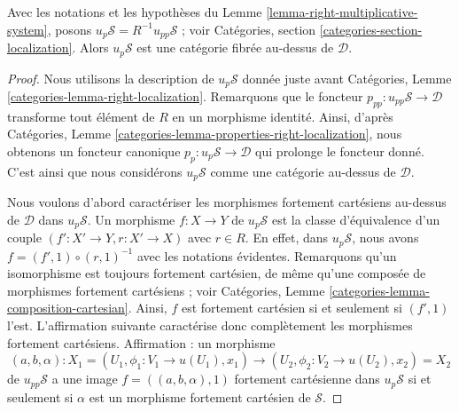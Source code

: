 \begin{lemma}
\label{lemma-fibred-category-pullback}
Avec les notations et les hypothèses du
Lemme \ref{lemma-right-multiplicative-system},
posons $u_p\mathcal{S} = R^{-1}u_{pp}\mathcal{S}$ ; voir
Catégories, section \ref{categories-section-localization}.
Alors $u_p\mathcal{S}$ est une catégorie fibrée au-dessus de $\mathcal{D}$.
\end{lemma}

\begin{proof}
Nous utilisons la description de $u_p\mathcal{S}$ donnée juste avant
Catégories, Lemme \ref{categories-lemma-right-localization}.
Remarquons que le foncteur $p_{pp} : u_{pp}\mathcal{S} \to \mathcal{D}$
transforme tout élément de $R$ en un morphisme identité.
Ainsi, d'après
Catégories, Lemme \ref{categories-lemma-properties-right-localization},
nous obtenons un foncteur canonique $p_p : u_p\mathcal{S} \to \mathcal{D}$
qui prolonge le foncteur donné. C'est ainsi que nous considérons
$u_p\mathcal{S}$ comme une catégorie au-dessus de $\mathcal{D}$.

\medskip\noindent
Nous voulons d'abord caractériser les morphismes fortement cartésiens au-dessus de $\mathcal{D}$
dans $u_p\mathcal{S}$.
Un morphisme $f : X \to Y$ de $u_p\mathcal{S}$ est la classe d'équivalence
d'un couple $(f' : X' \to Y, r : X' \to X)$ avec $r \in R$.
En effet, dans $u_p\mathcal{S}$, nous avons $f = (f', 1) \circ (r, 1)^{-1}$
avec les notations évidentes.
Remarquons qu'un isomorphisme est toujours fortement cartésien, de même qu'une
composée de morphismes fortement cartésiens ; voir
Catégories, Lemme \ref{categories-lemma-composition-cartesian}.
Ainsi, $f$ est fortement cartésien si et seulement si $(f', 1)$ l'est.
L'affirmation suivante caractérise donc complètement les morphismes fortement cartésiens.
Affirmation : un morphisme
$$
(a, b, \alpha) :
X_1 = (U_1, \phi_1 : V_1 \to u(U_1), x_1)
\longrightarrow
(U_2, \phi_2 : V_2 \to u(U_2), x_2) = X_2
$$
de $u_{pp}\mathcal{S}$ a une image $f = ((a, b, \alpha), 1)$
fortement cartésienne dans $u_p\mathcal{S}$ si et seulement si $\alpha$
est un morphisme fortement cartésien de $\mathcal{S}$.


\end{proof}
